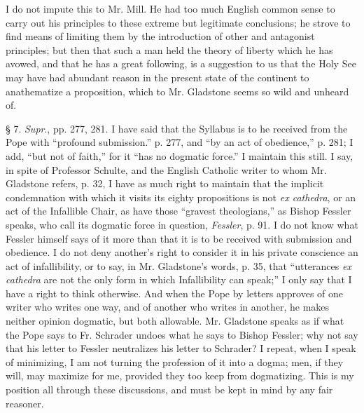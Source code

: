 I do not impute this to Mr. Mill. He had too much English common
sense to carry out his principles to these extreme but legitimate
conclusions; he strove to find means of limiting them by the
introduction of other and antagonist principles; but then that such a
man held the theory of liberty which he has avowed, and that he has a
great following, is a suggestion to us that the Holy See may have had
abundant reason in the present state of the continent to anathematize a
proposition, which to Mr. Gladstone seems so wild and unheard of.

§ 7.
\emph{Supr}., pp. 277, 281. I have said that the Syllabus is to he
received from the Pope with ``profound submission.'' p. 277, and
``by an act of obedience,'' p. 281; I add, ``but not
of faith,'' for it ``has no dogmatic force.'' I maintain this
still. I say, in spite of Professor Schulte, and the English Catholic
writer to whom Mr. Gladstone refers, p. 32, I have as much right to
maintain that the implicit condemnation with which it visits its eighty
propositions is not \emph{ex cathedra}, or an act of the Infallible
Chair, as have those ``gravest theologians,'' as Bishop Fessler
speaks, who call its dogmatic force in question, \emph{Fessler}, p. 91.
I do not know what Fessler himself says of it more than that it is to be
received with submission and obedience. I do not deny another's right to
consider it in his private conscience an act of infallibility, or to
say, in Mr. Gladstone's words, p. 35, that ``utterances \emph{ex
cathedra} are not the only form in which Infallibility can
speak;'' I only say that I have a right to think otherwise. And when
the Pope by letters approves of one writer who writes one way, and of
another who writes in another, he makes neither opinion dogmatic, but
both allowable. Mr. Gladstone speaks as if what the Pope says to Fr.
Schrader undoes what he says to Bishop Fessler; why not say that his
letter to Fessler neutralizes his letter to Schrader? I repeat, when I
speak of minimizing, I am not turning the profession of it into a dogma;
men, if they will, may maximize for me, provided they too keep from
dogmatizing. This is my position all through these discussions, and must
be kept in mind by any fair reasoner.


